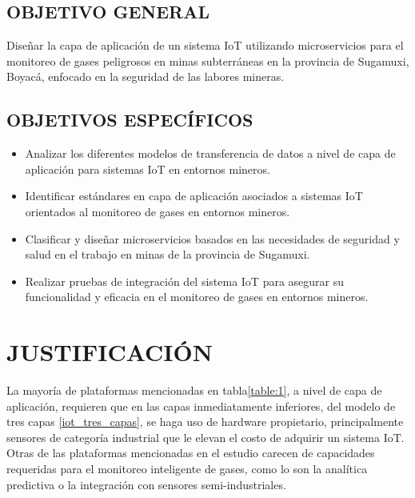 \documentclass[stu,12pt,floatsintext]{apa7}
\begin{document}
	\subsection{OBJETIVO GENERAL}
	Diseñar la capa de aplicación de un sistema IoT utilizando microservicios para el monitoreo de gases peligrosos en minas subterráneas en la provincia de Sugamuxi, Boyacá, enfocado en la seguridad de las labores mineras.
	\subsection{OBJETIVOS ESPECÍFICOS}
	\begin{itemize}
		\item Analizar los diferentes modelos de transferencia de datos a nivel de capa de aplicación para sistemas IoT en entornos mineros.
		\item Identificar estándares en capa de aplicación asociados a sistemas IoT orientados al monitoreo de gases en entornos mineros.
		\item Clasificar y diseñar microservicios basados en las necesidades de seguridad y salud en el trabajo en minas de la provincia de Sugamuxi.
		\item Realizar pruebas de integración del sistema IoT para asegurar su funcionalidad y eficacia en el monitoreo de gases en entornos mineros.
	\end{itemize}
	\section{JUSTIFICACIÓN}
		
		La mayoría de plataformas mencionadas en tabla\ref{table:1}, a nivel de capa de aplicación, requieren que en las capas inmediatamente inferiores, del modelo de tres capas \ref{iot_tres_capas}, se haga uso de hardware propietario, principalmente sensores de categoría industrial que le elevan el costo de adquirir un sistema IoT. Otras de las plataformas mencionadas en el estudio carecen de capacidades requeridas para el monitoreo inteligente de gases, como lo son la analítica predictiva o la integración con sensores semi-industriales.
			
\end{document}
